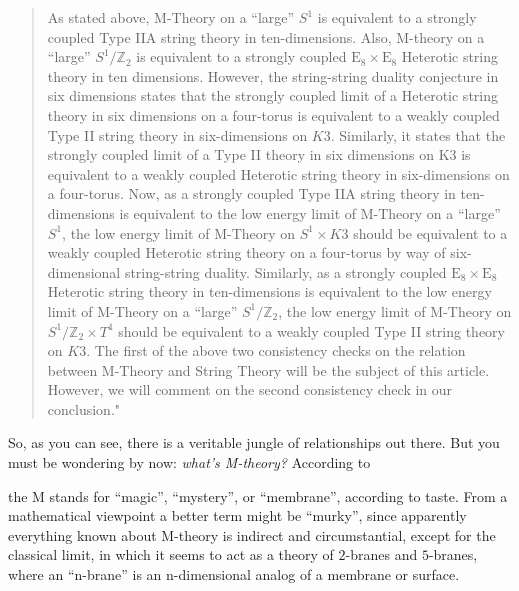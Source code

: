 \documentclass{article}
\def\tightlist{}
\renewcommand{\texttt}[1]{%
  \begingroup
  \ttfamily
  \begingroup\lccode`~=`/\lowercase{\endgroup\def~}{/\discretionary{}{}{}}%
  \begingroup\lccode`~=`[\lowercase{\endgroup\def~}{[\discretionary{}{}{}}%
  \begingroup\lccode`~=`.\lowercase{\endgroup\def~}{.\discretionary{}{}{}}%
  \catcode`/=\active\catcode`[=\active\catcode`.=\active
  \scantokens{#1\noexpand}%
  \endgroup
}
\begin{document}
\begin{quote}
As stated above, M-Theory on a ``large'' \(S^1\) is equivalent to a
strongly coupled Type IIA string theory in ten-dimensions. Also,
M-theory on a ``large'' \(S^1/\mathbb{Z}_2\) is equivalent to a strongly
coupled \(\mathrm{E}_8 \times \mathrm{E}_8\) Heterotic string theory in
ten dimensions. However, the string-string duality conjecture in six
dimensions states that the strongly coupled limit of a Heterotic string
theory in six dimensions on a four-torus is equivalent to a weakly
coupled Type II string theory in six-dimensions on \(K3\). Similarly, it
states that the strongly coupled limit of a Type II theory in six
dimensions on K3 is equivalent to a weakly coupled Heterotic string
theory in six-dimensions on a four-torus. Now, as a strongly coupled
Type IIA string theory in ten-dimensions is equivalent to the low energy
limit of M-Theory on a ``large'' \(S^1\), the low energy limit of
M-Theory on \(S^1 \times K3\) should be equivalent to a weakly coupled
Heterotic string theory on a four-torus by way of six-dimensional
string-string duality. Similarly, as a strongly coupled
\(\mathrm{E}_8 \times \mathrm{E}_8\) Heterotic string theory in
ten-dimensions is equivalent to the low energy limit of M-Theory on a
``large'' \(S^1/\mathbb{Z}_2\), the low energy limit of M-Theory on
\(S^1/\mathbb{Z}_2 \times T^4\) should be equivalent to a weakly coupled
Type II string theory on \(K3\). The first of the above two consistency
checks on the relation between M-Theory and String Theory will be the
subject of this article. However, we will comment on the second
consistency check in our conclusion."
\end{quote}

So, as you can see, there is a veritable jungle of relationships out
there. But you must be wondering by now: \emph{what's M-theory?}
According to


the M stands for ``magic'', ``mystery'', or ``membrane'', according to
taste. From a mathematical viewpoint a better term might be ``murky'',
since apparently everything known about M-theory is indirect and
circumstantial, except for the classical limit, in which it seems to act
as a theory of \(2\)-branes and \(5\)-branes, where an ``n-brane'' is an
n-dimensional analog of a membrane or surface.
\end{document}
